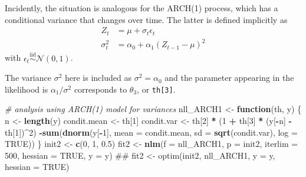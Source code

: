 \documentclass[]{book}
\newenvironment{Shaded}{\begin{snugshade}}{\end{snugshade}}
\newcommand{\KeywordTok}[1]{\textcolor[rgb]{0.13,0.29,0.53}{\textbf{#1}}}
\newcommand{\DataTypeTok}[1]{\textcolor[rgb]{0.13,0.29,0.53}{#1}}
\newcommand{\DecValTok}[1]{\textcolor[rgb]{0.00,0.00,0.81}{#1}}
\newcommand{\FloatTok}[1]{\textcolor[rgb]{0.00,0.00,0.81}{#1}}
\newcommand{\StringTok}[1]{\textcolor[rgb]{0.31,0.60,0.02}{#1}}
\newcommand{\CommentTok}[1]{\textcolor[rgb]{0.56,0.35,0.01}{\textit{#1}}}
\newcommand{\OtherTok}[1]{\textcolor[rgb]{0.56,0.35,0.01}{#1}}
\newcommand{\ControlFlowTok}[1]{\textcolor[rgb]{0.13,0.29,0.53}{\textbf{#1}}}
\newcommand{\OperatorTok}[1]{\textcolor[rgb]{0.81,0.36,0.00}{\textbf{#1}}}
\newcommand{\NormalTok}[1]{#1}
\begin{document}
Incidently, the situation is analogous for the ARCH(1) process, which
has a conditional variance that changes over time. The latter is defined
implicitly as \[
\begin{align*}
Z_t &= \mu + \sigma_t\epsilon_t\\
\sigma_t^2 &=\alpha_0+\alpha_1(Z_{t-1}-\mu)^2 
\end{align*}
\] with \(\epsilon_t \stackrel{\mathrm{iid}}{\sim} \mathcal{N}(0, 1)\).

The variance \(\sigma^2\) here is included as \(\sigma^2=\alpha_0\) and
the parameter appearing in the likelihood is \(\alpha_1/\sigma^2\)
corresponds to \(\theta_3\), or \texttt{th{[}3{]}}.

\begin{Shaded}
\begin{Highlighting}[]
\CommentTok{# analysis using ARCH(1) model for variances}
\NormalTok{nll_ARCH1 <-}\StringTok{ }\ControlFlowTok{function}\NormalTok{(th, y) \{}
\NormalTok{    n <-}\StringTok{ }\KeywordTok{length}\NormalTok{(y)}
\NormalTok{    condit.mean <-}\StringTok{ }\NormalTok{th[}\DecValTok{1}\NormalTok{]}
\NormalTok{    condit.var <-}\StringTok{ }\NormalTok{th[}\DecValTok{2}\NormalTok{] }\OperatorTok{*}\StringTok{ }\NormalTok{(}\DecValTok{1} \OperatorTok{+}\StringTok{ }\NormalTok{th[}\DecValTok{3}\NormalTok{] }\OperatorTok{*}\StringTok{ }\NormalTok{(y[}\OperatorTok{-}\NormalTok{n] }\OperatorTok{-}\StringTok{ }\NormalTok{th[}\DecValTok{1}\NormalTok{])}\OperatorTok{^}\DecValTok{2}\NormalTok{)}
    \OperatorTok{-}\KeywordTok{sum}\NormalTok{(}\KeywordTok{dnorm}\NormalTok{(y[}\OperatorTok{-}\DecValTok{1}\NormalTok{], }\DataTypeTok{mean =}\NormalTok{ condit.mean, }\DataTypeTok{sd =} \KeywordTok{sqrt}\NormalTok{(condit.var), }\DataTypeTok{log =} \OtherTok{TRUE}\NormalTok{))}
\NormalTok{\}}
\NormalTok{init2 <-}\StringTok{ }\KeywordTok{c}\NormalTok{(}\DecValTok{0}\NormalTok{, }\DecValTok{1}\NormalTok{, }\FloatTok{0.5}\NormalTok{)}
\NormalTok{fit2 <-}\StringTok{ }\KeywordTok{nlm}\NormalTok{(}\DataTypeTok{f =}\NormalTok{ nll_ARCH1, }\DataTypeTok{p =}\NormalTok{ init2, }\DataTypeTok{iterlim =} \DecValTok{500}\NormalTok{, }\DataTypeTok{hessian =} \OtherTok{TRUE}\NormalTok{, }\DataTypeTok{y =}\NormalTok{ y)}
\NormalTok{## fit2 <- optim(init2, nll_ARCH1, y = y, hessian = TRUE)}
\end{Highlighting}
\end{Shaded}
\end{document}
